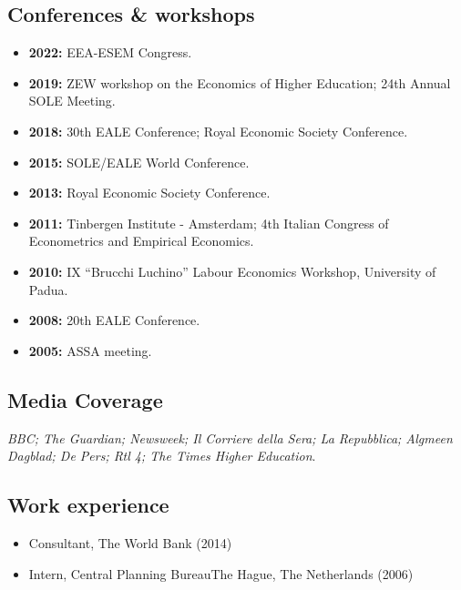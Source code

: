 \documentclass[11pt]{article}
\begin{document}
\subsection*{\sc Conferences \& workshops}
\begin{itemize}[itemsep=.9pt, leftmargin=20pt]
    \item[]\textbf{2022:} EEA-ESEM Congress.
    \item[]\textbf{2019:} ZEW workshop on the Economics of Higher Education; 24th Annual SOLE Meeting.
    \item[]\textbf{2018:} 30th EALE Conference; Royal Economic Society Conference.
    \item[]\textbf{2015:} SOLE/EALE World Conference.
    \item[]\textbf{2013:} Royal Economic Society Conference.
    \item[]\textbf{2011:} Tinbergen Institute - Amsterdam; 4th Italian Congress of Econometrics and Empirical Economics.
    \item[]\textbf{2010:} IX “Brucchi Luchino” Labour Economics Workshop, University of Padua.
    \item[]\textbf{2008:} 20th EALE Conference.
    \item[]\textbf{2005:} ASSA meeting.
\end{itemize}

\subsection*{\sc Media Coverage}
\emph{BBC; The Guardian; Newsweek; Il Corriere della Sera; La Repubblica; Algmeen Dagblad; De Pers; Rtl 4; The Times Higher Education}.

\subsection*{\sc Work experience}
\begin{itemize}[leftmargin=20pt]
    \itemsep-.1cm
    \item[] Consultant, The World Bank (2014)
    \item[] Intern, Central Planning Bureau\textendash The Hague, The Netherlands (2006)
\end{itemize}
\end{document}

